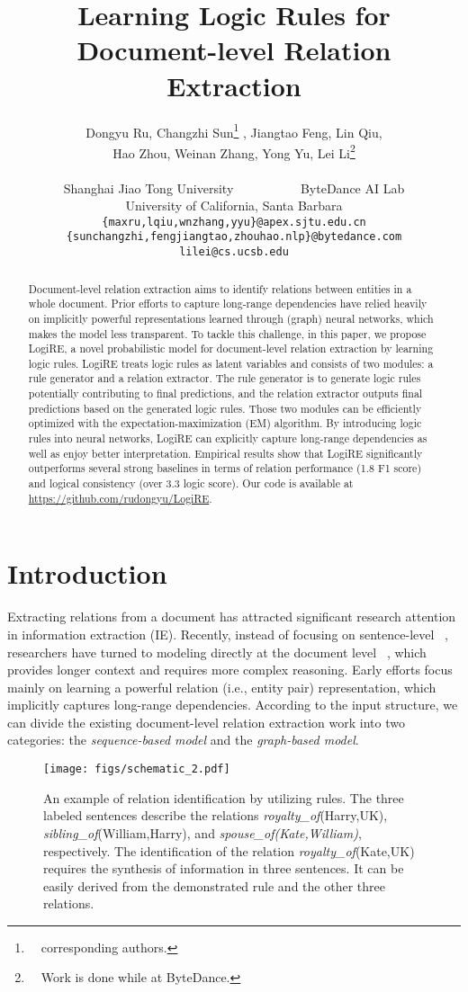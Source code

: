\documentclass[11pt]{article}
\title{ Learning Logic Rules for Document-level Relation Extraction}
\author{
\parbox{\linewidth}{
\centering
Dongyu Ru, 
Changzhi Sun\thanks{\ \ corresponding authors.} , Jiangtao Feng, 
Lin Qiu,\\ 
Hao Zhou,
Weinan Zhang\footnotemark[1] , 
Yong Yu, 
Lei Li\thanks{\ \ Work is done while at ByteDance.}
}\\
Shanghai Jiao Tong University ~~~~~~~~~~ByteDance AI Lab \\
University of California, Santa Barbara\\
{\texttt{\{maxru,lqiu,wnzhang,yyu\}@apex.sjtu.edu.cn}} \\
{\texttt{\{sunchangzhi,fengjiangtao,zhouhao.nlp\}@bytedance.com}}\\
{\texttt{lilei@cs.ucsb.edu}}
}
\newcommand{\mymodel}{LogiRE\xspace}
\begin{document}
\maketitle
\begin{abstract}
Document-level relation extraction aims to identify relations between entities in a whole document. 
Prior efforts to capture long-range dependencies have relied heavily on implicitly powerful representations learned through (graph) neural networks,
which makes the model less transparent.
To tackle this challenge,
in this paper, we propose \mymodel, a novel probabilistic model for document-level relation extraction by learning logic rules.
\mymodel treats logic rules as latent variables
and consists of two modules: a rule generator and a relation extractor.
The rule generator is to generate logic rules potentially contributing to final predictions, 
and the relation extractor outputs final predictions based on the generated logic rules.
Those two modules can be efficiently optimized with the expectation-maximization (EM) algorithm.
By introducing logic rules into neural networks, 
\mymodel can explicitly capture long-range dependencies as well as enjoy better interpretation.
Empirical results show that \mymodel significantly outperforms several strong baselines in terms of relation performance (1.8 F1 score) and logical consistency (over 3.3 logic score).
Our code is available at \url{https://github.com/rudongyu/LogiRE}. \end{abstract}

\section{Introduction}
\label{sec:intro}
Extracting relations from a document has attracted significant research attention in information extraction (IE).
Recently, instead of focusing on sentence-level ~\cite{socher-etal-2012-semantic, dos-santos-etal-2015-classifying, han-etal-2018-hierarchical, zhang-etal-2018-graph, wang-etal-2021-enpar, wang-etal-2021-unire},
researchers have turned to modeling directly at the document level ~\cite{wang2019fine, ye-etal-2020-coreferential, zhou2021atlop},
which provides longer context and requires more complex reasoning.
Early efforts focus mainly on learning a powerful relation (i.e., entity pair) representation, which implicitly captures long-range dependencies.
According to the input structure, we can divide the existing document-level relation extraction work into two categories: the \emph{sequence-based model}  and the \emph{graph-based model}.
\begin{figure}
    \centering
    \texttt{[image: figs/schematic\_2.pdf]}
    \caption{An example of relation identification by utilizing rules. The three labeled sentences describe the relations \textit{royalty\_of}(Harry,UK), \textit{sibling\_of}(William,Harry), and \textit{spouse\_of(Kate,William)}, respectively. The identification of the relation \textit{royalty\_of}(Kate,UK) requires the synthesis of information in three sentences. It can be easily derived from the demonstrated rule and the other three relations.}
    \label{fig:schematic}
    \vspace{-10pt}
\end{figure}
\end{document}
